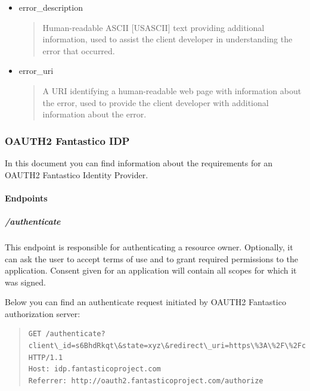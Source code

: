 \documentclass[letterpaper,10pt,english]{sphinxmanual}
\begin{document}
\begin{itemize}
\begin{itemize}
\begin{itemize}
\begin{quote}
The resource owner or authorization server denied the request.
\end{quote}

\end{itemize}

\end{itemize}

\item {} 
error\_description
\begin{quote}

Human-readable ASCII {[}USASCII{]} text providing additional information, used to assist the client developer in
understanding the error that occurred.
\end{quote}

\item {} 
error\_uri
\begin{quote}

A URI identifying a human-readable web page with information about the error, used to provide the client developer
with additional information about the error.
\end{quote}

\end{itemize}


\subsubsection{OAUTH2 Fantastico IDP}
\label{features/oauth2/compatible_idp:oauth2-fantastico-idp}\label{features/oauth2/compatible_idp::doc}
In this document you can find information about the requirements for an OAUTH2 Fantastico Identity Provider.


\paragraph{Endpoints}
\label{features/oauth2/compatible_idp:endpoints}

\subparagraph{/authenticate}
\label{features/oauth2/compatible_idp:authenticate}
This endpoint is responsible for authenticating a resource owner. Optionally, it can ask the user to accept terms of use and
to grant required permissions to the application. Consent given for an application will contain all scopes for which it was
signed.

Below you can find an authenticate request initiated by OAUTH2 Fantastico authorization server:
\begin{quote}

\begin{Verbatim}[commandchars=\\\{\}]
GET /authenticate?client\_id=s6BhdRkqt\&state=xyz\&redirect\_uri=https\%3A\%2F\%2Fclient\%2fantasticoproject\%2Ecom\%2Fcb\%3Fclient\_id\%3Ds6BhdRkqt\%26state\%3D\&scopes=simple\_menus.create\%20simple\_menus.update\%20simple\_menus.delete HTTP/1.1
Host: idp.fantasticoproject.com
Referrer: http://oauth2.fantasticoproject.com/authorize
\end{Verbatim}
\end{quote}
\end{document}
